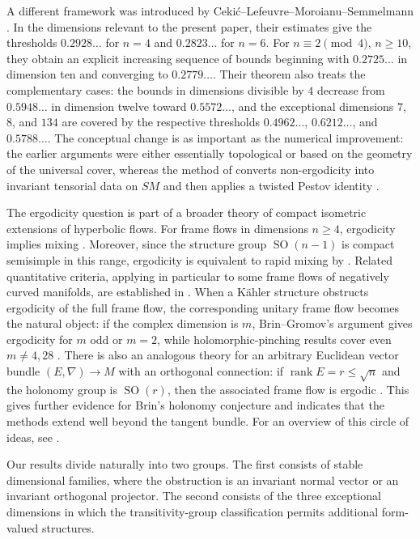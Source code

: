 \documentclass[reqno,11pt]{amsart}
\theoremstyle{definition}
\newcommand{\SM}{SM}
\newcommand{\SO}{\operatorname{SO}}
\begin{document}
A different framework was introduced by
Ceki\'c--Lefeuvre--Moroianu--Semmelmann \cite{CLMS24}.  In the dimensions
relevant to the present paper, their estimates give the thresholds
$0.2928\ldots$ for $n=4$ and $0.2823\ldots$ for $n=6$.  For
$n\equiv2\pmod4$, $n\geq10$, they obtain an explicit increasing sequence of
bounds beginning with $0.2725\ldots$ in dimension ten and converging to
$0.2779\ldots$.  Their theorem also treats the complementary cases: the
bounds in dimensions divisible by $4$ decrease from $0.5948\ldots$ in
dimension twelve toward $0.5572\ldots$, and the exceptional dimensions
$7$, $8$, and $134$ are covered by the respective thresholds
$0.4962\ldots$, $0.6212\ldots$, and $0.5788\ldots$.  The conceptual
change is as important as the numerical improvement: the earlier arguments
were either essentially topological or based on the geometry of the
universal cover, whereas the method of \cite{CLMS24} converts
non-ergodicity into invariant tensorial data on $\SM$ and then applies a
twisted Pestov identity \cite{BrinGromov80,BrinKarcher84,BurnsPollicott03}.

The ergodicity question is part of a broader theory of compact isometric
extensions of hyperbolic flows.  For frame flows in dimensions $n\geq4$, ergodicity implies mixing
\cite{Lefeuvre23}. Moreover, since the structure group
$\SO(n-1)$ is compact semisimple in this range, ergodicity is
equivalent to rapid mixing by
\cite{CekicLefeuvreSemiclassical24}. Related quantitative criteria,
applying in particular to some frame flows of negatively curved
manifolds, are established in \cite{PollicottZhang25}.  When a K\"ahler
structure obstructs ergodicity of the full frame flow, the corresponding
unitary frame flow becomes the natural object: if the complex dimension is
$m$, Brin--Gromov's argument gives ergodicity for $m$ odd or $m=2$, while
holomorphic-pinching results cover even $m\neq4,28$
\cite{BrinGromov80,CLMSUnitary24}.  There is also an analogous theory for an
arbitrary Euclidean vector bundle $(E,\nabla)\to M$ with an orthogonal
connection: if $\operatorname{rank}E=r\leq\sqrt n$ and the holonomy group is
$\SO(r)$, then the associated frame flow is ergodic
\cite{CekicLefeuvreConnections25}.  This gives further evidence for Brin's
holonomy conjecture and indicates that the methods extend well beyond the
tangent bundle.  For an overview of this circle of ideas, see
\cite{CLMS22Survey}.

Our results divide naturally into two groups.  The first consists of
stable dimensional families, where the obstruction is an invariant normal
vector or an invariant orthogonal projector.  The second consists of the
three exceptional dimensions in which the transitivity-group classification
permits additional form-valued structures.
\end{document}
